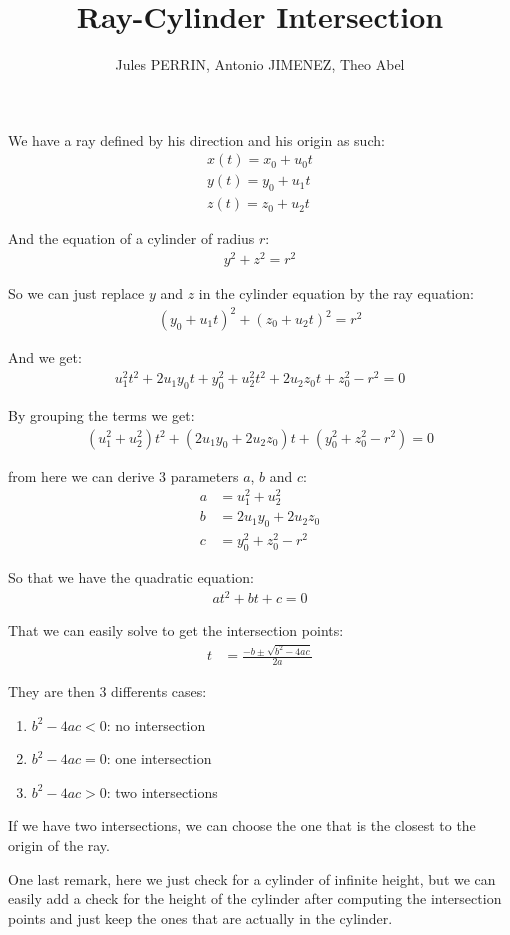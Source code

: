 \documentclass[12pt]{article}
\title{Ray-Cylinder Intersection}
\author{Jules PERRIN, Antonio JIMENEZ, Theo Abel}
\begin{document}
\maketitle

We have a ray defined by his direction and his origin as such:
\begin{align*}
    x(t) = x_0 + u_0 t \\
    y(t) = y_0 + u_1 t \\
    z(t) = z_0 + u_2 t
\end{align*}

And the equation of a cylinder of radius $r$:
\begin{align*}
    y^2 + z^2 = r^2
\end{align*}

So we can just replace $y$ and $z$ in the cylinder equation by the ray equation:
\begin{align*}
    (y_0 + u_1 t)^2 + (z_0 + u_2 t)^2 = r^2
\end{align*}

And we get:
\begin{align*}
    u_1^2 t^2 + 2 u_1 y_0 t + y_0^2 + u_2^2 t^2 + 2 u_2 z_0 t + z_0^2 - r^2 = 0
\end{align*}

By grouping the terms we get:
\begin{align*}
    (u_1^2 + u_2^2)t^2 + (2 u_1 y_0 + 2 u_2 z_0)t + (y_0^2 + z_0^2 - r^2) = 0
\end{align*}

from here we can derive 3 parameters $a$, $b$ and $c$:
\begin{align*}
    a &= u_1^2 + u_2^2 \\
    b &= 2 u_1 y_0 + 2 u_2 z_0 \\
    c &= y_0^2 + z_0^2 - r^2
\end{align*}

So that we have the quadratic equation:
\begin{align*}
    at^2 + bt + c = 0
\end{align*}

That we can easily solve to get the intersection points:
\begin{align*}
    t &= \frac{-b \pm \sqrt{b^2 - 4ac}}{2a}
\end{align*}

They are then 3 differents cases:
\begin{enumerate}
    \item $b^2 - 4ac < 0$: no intersection
    \item $b^2 - 4ac = 0$: one intersection
    \item $b^2 - 4ac > 0$: two intersections
\end{enumerate}

If we have two intersections, we can choose the one that is the closest to the origin of the ray.

One last remark, here we just check for a cylinder of infinite height, but we can easily add a check for the height of the cylinder
after computing the intersection points and just keep the ones that are actually in the cylinder.
\end{document}
